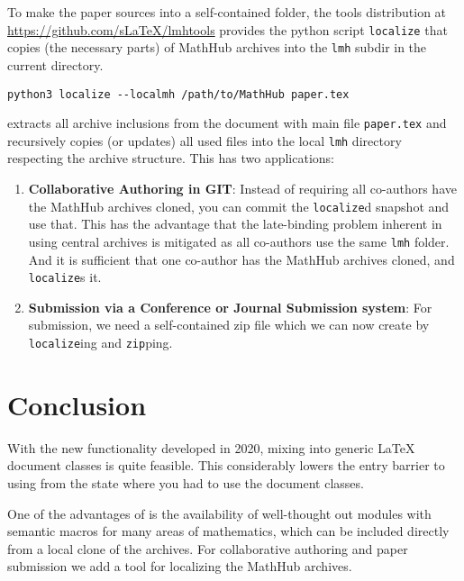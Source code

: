 \documentclass{llncs}
\begin{document}
To make the paper sources into a self-contained folder, the \sTeX tools distribution at
\url{https://github.com/sLaTeX/lmhtools} provides the python script \texttt{localize} that
copies (the necessary parts) of MathHub archives into the \texttt{lmh} subdir in the
current directory.
\begin{verbatim}
python3 localize --localmh /path/to/MathHub paper.tex
\end{verbatim}
extracts all archive inclusions from the \sTeX document with main file \verb|paper.tex|
and recursively copies (or updates) all used files into the local \verb|lmh| directory
respecting the archive structure. This has two applications:
\begin{enumerate}
\item \textbf{Collaborative Authoring in GIT}: Instead of requiring all co-authors have
  the MathHub archives cloned, you can commit the \texttt{localize}d snapshot and use
  that. This has the advantage that the late-binding problem inherent in using central
  archives is mitigated as all co-authors use the same \texttt{lmh} folder. And it is
  sufficient that one co-author has the MathHub archives cloned, and \texttt{localize}s
  it.
\item \textbf{Submission via a Conference or Journal Submission system}: For submission,
  we need a self-contained zip file which we can now create by \texttt{localize}ing and
  \texttt{zip}ping.
\end{enumerate}

\section{Conclusion}\label{sec:conc}
With the new functionality developed in 2020, mixing \sTeX into generic {\LaTeX} document
classes is quite feasible. This considerably lowers the entry barrier to using \sTeX from
the state where you had to use the \sTeX document classes.

One of the advantages of \sTeX is the availability of well-thought out modules with
semantic macros for many areas of mathematics, which can be included directly from a local
clone of the archives. For collaborative authoring and paper submission we add a tool for
localizing the MathHub archives.

\printbibliography
\end{document}

